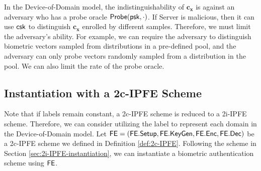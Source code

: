 In the Device-of-Domain model, the indistinguishability of $\mathbf{c_x}$ is against an adversary who has a probe oracle ${\sf Probe}({\sf psk}, \cdot)$. If {\sf Server} is malicious, then it can use ${\sf csk}$ to distinguish $\mathbf{c_x}$ enrolled by different samples. Therefore, we must limit the adversary's ability. For example, we can require the adversary to distinguish biometric vectors sampled from distributions in a pre-defined pool, and the adversary can only probe vectors randomly sampled from a distribution in the pool. We can also limit the rate of the probe oracle.


\subsection{Instantiation with a 2c-IPFE Scheme}
\label{sec:2c-IPFE-instantiation}

Note that if labels remain constant, a 2c-IPFE scheme is reduced to a 2i-IPFE scheme. Therefore, we can consider utilizing the label to represent each domain in the Device-of-Domain model. Let ${\sf FE} = ({\sf FE.Setup}, {\sf FE.KeyGen}, {\sf FE.Enc}, {\sf FE.Dec})$ be a 2c-IPFE scheme we defined in Definition \ref{def:2c-IPFE}. Following the scheme in Section \ref{sec:2i-IPFE-instantiation}, we can instantiate a biometric authentication scheme using ${\sf FE}$.

